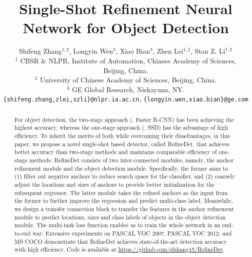 \documentclass[10pt,twocolumn,letterpaper]{article}
\begin{document}
\title{Single-Shot Refinement Neural Network for Object Detection}

\author{Shifeng Zhang$^{1,2}$, Longyin Wen$^3$, Xiao Bian$^3$, Zhen Lei$^{1,2}$, Stan Z. Li$^{1,2}$\\
$^1$ CBSR \& NLPR, Institute of Automation, Chinese Academy of Sciences, Beijing, China. \\
$^2$ University of Chinese Academy of Sciences, Beijing, China. \\
$^3$ GE Global Research, Niskayuna, NY. \\
{\tt\small \{shifeng.zhang,zlei,szli\}@nlpr.ia.ac.cn}, {\tt \small \{longyin.wen,xiao.bian\}@ge.com}
}

\maketitle


\begin{abstract}

For object detection, the two-stage approach (\eg, Faster R-CNN) has been achieving the highest accuracy, whereas the one-stage approach (\eg, SSD) has the advantage of high efficiency. To inherit the merits of both while overcoming their disadvantages, in this paper, we propose a novel single-shot based detector, called RefineDet, that achieves better accuracy than two-stage methods and maintains comparable efficiency of one-stage methods. RefineDet consists of two inter-connected modules, namely, the anchor refinement module and the object detection module. Specifically, the former aims to (1) filter out negative anchors to reduce search space for the classifier, and (2) coarsely adjust the locations and sizes of anchors to provide better initialization for the subsequent regressor. The latter module takes the refined anchors as the input from the former to further improve the regression and predict multi-class label. Meanwhile, we design a transfer connection block to transfer the features in the anchor refinement module to predict locations, sizes and class labels of objects in the object detection module. The multi-task loss function enables us to train the whole network in an end-to-end way. Extensive experiments on PASCAL VOC 2007, PASCAL VOC 2012, and MS COCO demonstrate that RefineDet achieves state-of-the-art detection accuracy with high efficiency. Code is available at \url{https://github.com/sfzhang15/RefineDet}.

\end{abstract}
\end{document}
